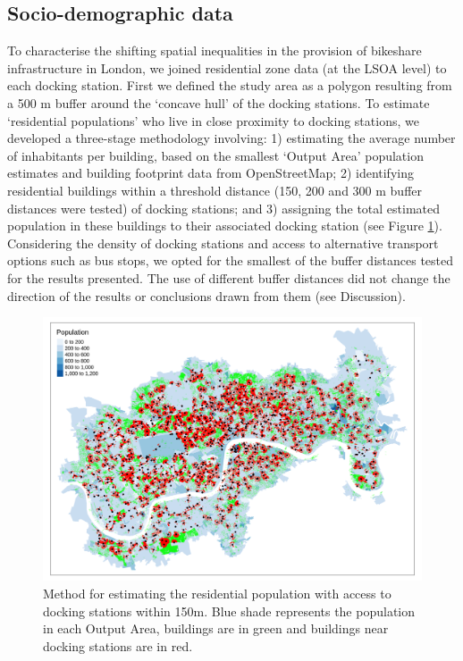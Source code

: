 \documentclass[
]{article}
\begin{document}
\hypertarget{socio-demographic-data}{%
\subsection{Socio-demographic data}\label{socio-demographic-data}}

To characterise the shifting spatial inequalities in the provision of bikeshare infrastructure in London, we joined residential zone data (at the LSOA level) to each docking station.
First we defined the study area as a polygon resulting from a 500 m buffer around the `concave hull' of the docking stations.
To estimate `residential populations' who live in close proximity to docking stations, we developed a three-stage methodology involving: 1) estimating the average number of inhabitants per building, based on the smallest `Output Area' population estimates and building footprint data from OpenStreetMap; 2) identifying residential buildings within a threshold distance (150, 200 and 300 m buffer distances were tested) of docking stations; and 3) assigning the total estimated population in these buildings to their associated docking station (see Figure \ref{fig:bikeshare-resi-buildings}).
Considering the density of docking stations and access to alternative transport options such as bus stops, we opted for the smallest of the buffer distances tested for the results presented.
The use of different buffer distances did not change the direction of the results or conclusions drawn from them (see Discussion).

\begin{figure}

{\centering \includegraphics[width=0.7\linewidth]{figures/bikeshare-resi-buildings} 

}

\caption{Method for estimating the residential population with access to docking stations within 150m. Blue shade represents the population in each Output Area, buildings are in green and buildings near docking stations are in red.}\label{fig:bikeshare-resi-buildings}
\end{figure}
\end{document}

